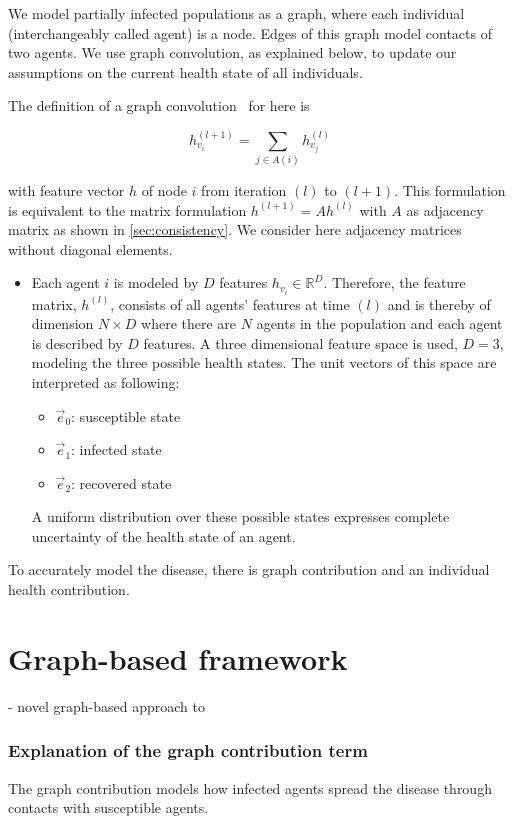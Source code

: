 \documentclass[%
 reprint,
 amsmath,amssymb,showkeys,
 aps,
]{revtex4-1}
\begin{document}
We model partially infected populations as a graph, where each individual (interchangeably called agent) is a node. Edges of this graph model contacts of two agents. We use graph convolution, as explained below, to update our assumptions on the current health state of all individuals.

The definition of a graph convolution~\cite{Kipf2017SemiSupervisedCW} for here is

\begin{equation}
	\label{eq:graph_convolution}
	h_{v_i}^{(l+1)} = \sum_{j\in A(i)} h_{v_j}^{(l)}
\end{equation}

with feature vector $h$ of node $i$ from iteration $(l)$ to $(l+1)$. This formulation is equivalent to the matrix formulation $h^{(l+1)} = A h^{(l)}$ with $A$ as adjacency matrix as shown in \ref{sec:consistency}. We consider here adjacency matrices without diagonal elements.

\begin{itemize}
	\item Each agent $i$ is modeled by $D$ features $h_{v_i} \in \mathbb{R}^D$. Therefore, the feature matrix, $h^{(l)}$, consists of all agents' features at time $(l)$ and is thereby of dimension $N\times D$ where there are $N$ agents in the population and each agent is described by $D$ features. A three dimensional feature space is used, $D=3$, modeling the three possible health states. The unit vectors of this space are interpreted as following:
	\begin{itemize}
		\item $\vec{e}_0$: susceptible state
		\item $\vec{e}_1$: infected state
		\item $\vec{e}_2$: recovered state
	\end{itemize}
	A uniform distribution over these possible states expresses complete uncertainty of the health state of an agent.
\end{itemize}

To accurately model the disease, there is graph contribution and an individual health contribution.

\section{\label{sec:framework}Graph-based framework}

- novel graph-based approach to

\subsubsection{Explanation of the graph contribution term}
The graph contribution models how infected agents spread the disease through contacts with susceptible agents.
\end{document}
